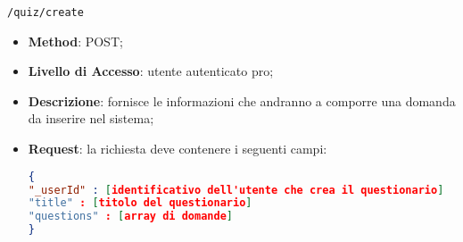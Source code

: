 	\item \texttt{/quiz/create}
		\begin{itemize}
			\item \textbf{Method}: POST;
			\item \textbf{Livello di Accesso}: utente autenticato pro;
			\item \textbf{Descrizione}: fornisce le informazioni che andranno a comporre una domanda da inserire nel sistema;
			\item \textbf{Request}: la richiesta deve contenere i seguenti campi:
\begin{lstlisting}[language=json,firstnumber=1]
{
"_userId" : [identificativo dell'utente che crea il questionario]
"title" : [titolo del questionario]
"questions" : [array di domande]
}
\end{lstlisting}
		\end{itemize}